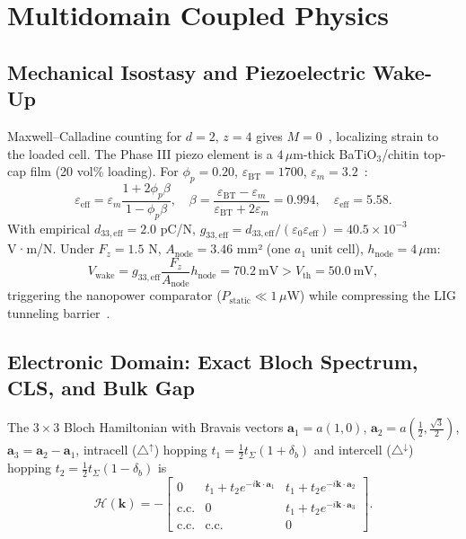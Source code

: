 \documentclass[11pt,a4paper]{article}
\theoremstyle{definition}
\theoremstyle{remark}
\begin{document}
\section{Multidomain Coupled Physics}

\subsection{Mechanical Isostasy and Piezoelectric Wake-Up}
Maxwell--Calladine counting for $d=2$, $z=4$ gives $M = 0$~\cite{maxwell1864,guest2003}, localizing strain to the loaded cell. The Phase III piezo element is a $4\,\mu$m-thick BaTiO$_3$/chitin top-cap film (20 vol\% loading). For $\phi_p = 0.20$, $\varepsilon_{\text{BT}} = 1700$, $\varepsilon_m = 3.2$~\cite{yamada1982}:
\begin{equation}
\varepsilon_{\text{eff}} = \varepsilon_m \frac{1 + 2\phi_p\beta}{1-\phi_p\beta},\quad \beta = \frac{\varepsilon_{\text{BT}}-\varepsilon_m}{\varepsilon_{\text{BT}}+2\varepsilon_m} = 0.994,\quad \varepsilon_{\text{eff}} = 5.58.
\end{equation}
With empirical $d_{33,\text{eff}} = 2.0$ pC/N, $g_{33,\text{eff}} = d_{33,\text{eff}}/(\varepsilon_0\varepsilon_{\text{eff}}) = 40.5\times 10^{-3}$ V·m/N. Under $F_z = 1.5$ N, $A_{\text{node}} = 3.46$ mm² (one $a_1$ unit cell), $h_{\text{node}} = 4\,\mu$m:
\begin{equation}
V_{\text{wake}} = g_{33,\text{eff}}\frac{F_z}{A_{\text{node}}}h_{\text{node}} = 70.2\ \text{mV} > V_{\text{th}} = 50.0\ \text{mV},
\end{equation}
triggering the nanopower comparator ($P_{\text{static}} \ll 1\,\mu$W) while compressing the LIG tunneling barrier~\cite{simmons1963}.

\subsection{Electronic Domain: Exact Bloch Spectrum, CLS, and Bulk Gap}
The $3\times 3$ Bloch Hamiltonian with Bravais vectors $\mathbf{a}_1 = a(1,0)$, $\mathbf{a}_2 = a(\tfrac{1}{2},\tfrac{\sqrt3}{2})$, $\mathbf{a}_3 = \mathbf{a}_2 - \mathbf{a}_1$, intracell ($\triangle^{\uparrow}$) hopping $t_1 = \tfrac12 t_\Sigma(1+\delta_b)$ and intercell ($\triangle^{\downarrow}$) hopping $t_2 = \tfrac12 t_\Sigma(1-\delta_b)$ is~\cite{ezawa2018,kempkes2019}
\begin{equation}
\mathcal{H}(\mathbf{k}) = -\begin{bmatrix}
0 & t_1+t_2e^{-i\mathbf{k}\cdot\mathbf{a}_1} & t_1+t_2e^{-i\mathbf{k}\cdot\mathbf{a}_2}\\
\text{c.c.} & 0 & t_1+t_2e^{-i\mathbf{k}\cdot\mathbf{a}_3}\\
\text{c.c.} & \text{c.c.} & 0
\end{bmatrix}.
\end{equation}
\end{document}
